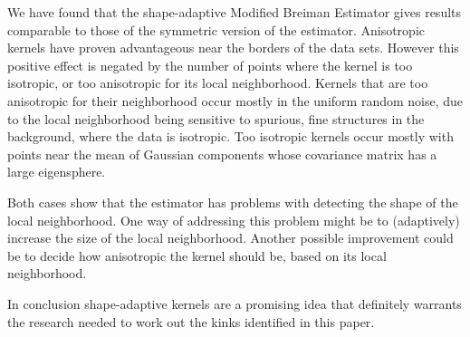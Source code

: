 
We have found that the shape-adaptive Modified Breiman Estimator gives results comparable to those of the symmetric version of the estimator.
Anisotropic kernels have proven advantageous near the borders of the data sets. However this positive effect is negated by the number of points where the kernel is too isotropic, or too anisotropic for its local neighborhood. 
	Kernels that are too anisotropic for their neighborhood occur mostly in the uniform random noise, due to the local neighborhood being sensitive to spurious, fine structures in the background, where the data is isotropic. 
	Too isotropic kernels occur mostly with points near the mean of Gaussian components whose covariance matrix has a large eigensphere. 

Both cases show that the estimator has problems with detecting the shape of the local neighborhood. One way of addressing this problem might be to (adaptively) increase the size of the local neighborhood. Another possible improvement could be to decide how anisotropic the kernel should be, based on its local neighborhood.

In conclusion shape-adaptive kernels are a promising idea that definitely warrants the research needed to work out the kinks identified in this paper.